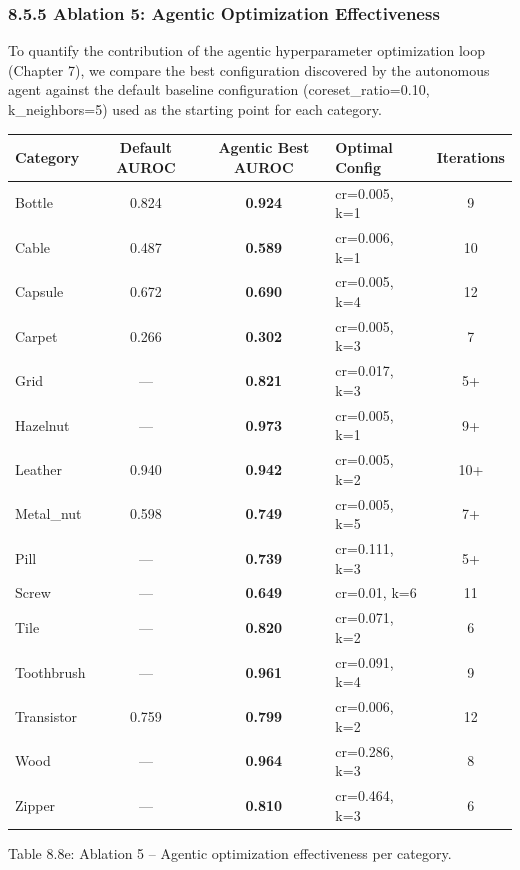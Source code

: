 \documentclass[12pt, a4paper, oneside]{report}
\begin{document}
\subsubsection{8.5.5 Ablation 5: Agentic Optimization Effectiveness}\label{ablation-5-agentic-optimization-effectiveness}

To quantify the contribution of the agentic hyperparameter optimization loop (Chapter 7), we compare the best configuration discovered by the autonomous agent against the default baseline configuration (coreset\_ratio=0.10, k\_neighbors=5) used as the starting point for each category.

{\def\LTcaptype{none} %
\begin{longtable}[]{@{}lcclc@{}}
\toprule\noalign{}
Category & Default AUROC & Agentic Best AUROC & Optimal Config & Iterations \\
\midrule\noalign{}
\endhead
\bottomrule\noalign{}
\endlastfoot
Bottle & 0.824 & \textbf{0.924} & cr=0.005, k=1 & 9 \\
Cable & 0.487 & \textbf{0.589} & cr=0.006, k=1 & 10 \\
Capsule & 0.672 & \textbf{0.690} & cr=0.005, k=4 & 12 \\
Carpet & 0.266 & \textbf{0.302} & cr=0.005, k=3 & 7 \\
Grid & --- & \textbf{0.821} & cr=0.017, k=3 & 5+ \\
Hazelnut & --- & \textbf{0.973} & cr=0.005, k=1 & 9+ \\
Leather & 0.940 & \textbf{0.942} & cr=0.005, k=2 & 10+ \\
Metal\_nut & 0.598 & \textbf{0.749} & cr=0.005, k=5 & 7+ \\
Pill & --- & \textbf{0.739} & cr=0.111, k=3 & 5+ \\
Screw & --- & \textbf{0.649} & cr=0.01, k=6 & 11 \\
Tile & --- & \textbf{0.820} & cr=0.071, k=2 & 6 \\
Toothbrush & --- & \textbf{0.961} & cr=0.091, k=4 & 9 \\
Transistor & 0.759 & \textbf{0.799} & cr=0.006, k=2 & 12 \\
Wood & --- & \textbf{0.964} & cr=0.286, k=3 & 8 \\
Zipper & --- & \textbf{0.810} & cr=0.464, k=3 & 6 \\
\end{longtable}
}

Table 8.8e: Ablation 5 -- Agentic optimization effectiveness per category.
\end{document}
